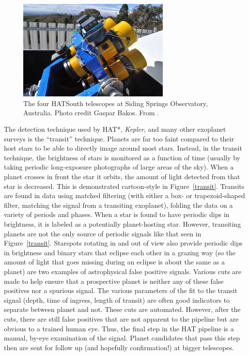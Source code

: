 \begin{figure}
\begin{centering}
\includegraphics[width=3in]{hs-scopes.png}
\caption{\label{hsscopes} The four HATSouth telescopes at Siding Springs Observatory, Australia.  Photo credit Gaspar Bakos.  From \cite{hatsouthpicture}.}
\end{centering}
\end{figure}

The detection technique used by HAT*, {\it Kepler}, and many other exoplanet surveys is the ``transit'' technique.  Planets are far too faint compared to their host stars to be able to directly image around most stars.  Instead, in the transit technique, the brightness of stars is monitored as a function of time (usually by taking periodic long-exposure photographs of large areas of the sky).  When a planet crosses in front the star it orbits, the amount of light detected from that star is decreased.  This is demonstrated cartoon-style in Figure~\ref{transit}.  Transits are found in data using matched filtering (with either a box- or trapezoid-shaped filter, matching the signal from a transiting exoplanet), folding the data on a variety of periods and phases.  When a star is found to have periodic dips in brightness, it is labeled as a potentially planet-hosting star.  However, transiting planets are not the only source of periodic signals like that seen in Figure~\ref{transit}.  Starspots rotating in and out of view also provide periodic dips in brightness and binary stars that eclipse each other in a grazing way (so the amount of light that goes missing during an eclipse is about the same as a planet) are two examples of astrophysical false positive signals. Various cuts are made to help ensure that a prospective planet is neither any of these false positives nor a spurious signal.  The various parameters of the fit to the transit signal (depth, time of ingress, length of transit) are often good indicators to separate between planet and not.  These cuts are automated.  However, after the cuts, there are still false positives that are not apparent to the pipeline but are obvious to a trained human eye.  Thus, the final step in the HAT pipeline is a manual, by-eye examination of the signal.  Planet candidates that pass this step then are sent for follow up (and hopefully confirmation!) at bigger telescopes.

